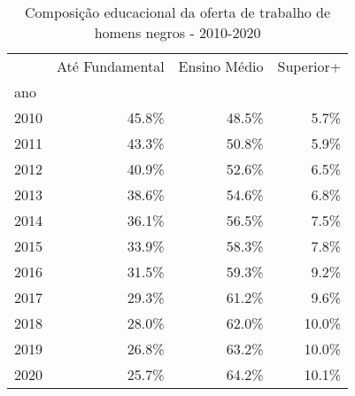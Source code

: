 \begin{table}[htb!]
\centering
\caption{Composição educacional da oferta de trabalho de homens negros - 2010-2020}
\begin{tabular}{lrrr}
\toprule
{} &  Até Fundamental &  Ensino Médio &  Superior+ \\
ano  &                  &               &            \\
\midrule
2010 &            45.8\% &         48.5\% &       5.7\% \\
2011 &            43.3\% &         50.8\% &       5.9\% \\
2012 &            40.9\% &         52.6\% &       6.5\% \\
2013 &            38.6\% &         54.6\% &       6.8\% \\
2014 &            36.1\% &         56.5\% &       7.5\% \\
2015 &            33.9\% &         58.3\% &       7.8\% \\
2016 &            31.5\% &         59.3\% &       9.2\% \\
2017 &            29.3\% &         61.2\% &       9.6\% \\
2018 &            28.0\% &         62.0\% &      10.0\% \\
2019 &            26.8\% &         63.2\% &      10.0\% \\
2020 &            25.7\% &         64.2\% &      10.1\% \\
\bottomrule
\end{tabular}
\end{table}
